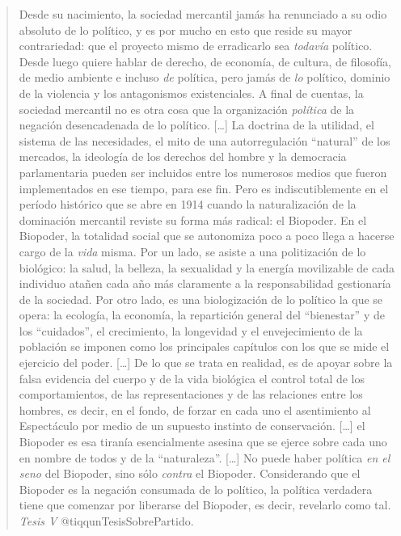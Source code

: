 \documentclass[
]{article}
\begin{document}
\begin{quote}
Desde su nacimiento, la sociedad mercantil jamás ha renunciado a su odio
absoluto de lo político, y es por mucho en esto que reside su mayor
contrariedad: que el proyecto mismo de erradicarlo sea \emph{todavía}
político. Desde luego quiere hablar de derecho, de economía, de cultura,
de filosofía, de medio ambiente e incluso \emph{de} política, pero jamás
de \emph{lo} político, dominio de la violencia y los antagonismos
existenciales. A final de cuentas, la sociedad mercantil no es otra cosa
que la organización \emph{política} de la negación desencadenada de lo
político. {[}\ldots{]} La doctrina de la utilidad, el sistema de las
necesidades, el mito de una autorregulación ``natural'' de los mercados,
la ideología de los derechos del hombre y la democracia parlamentaria
pueden ser incluidos entre los numerosos medios que fueron implementados
en ese tiempo, para ese fin. Pero es indiscutiblemente en el período
histórico que se abre en 1914 cuando la naturalización de la dominación
mercantil reviste su forma más radical: el Biopoder. En el Biopoder, la
totalidad social que se autonomiza poco a poco llega a hacerse cargo de
la \emph{vida} misma. Por un lado, se asiste a una politización de lo
biológico: la salud, la belleza, la sexualidad y la energía movilizable
de cada individuo atañen cada año más claramente a la responsabilidad
gestionaría de la sociedad. Por otro lado, es una biologización de lo
político la que se opera: la ecología, la economía, la repartición
general del ``bienestar'' y de los ``cuidados'', el crecimiento, la
longevidad y el envejecimiento de la población se imponen como los
principales capítulos con los que se mide el ejercicio del poder.
{[}\ldots{]} De lo que se trata en realidad, es de apoyar sobre la falsa
evidencia del cuerpo y de la vida biológica el control total de los
comportamientos, de las representaciones y de las relaciones entre los
hombres, es decir, en el fondo, de forzar en cada uno el asentimiento al
Espectáculo por medio de un supuesto instinto de conservación.
{[}\ldots{]} el Biopoder es esa tiranía esencialmente asesina que se
ejerce sobre cada uno en nombre de todos y de la ``naturaleza''.
{[}\ldots{]} No puede haber política \emph{en el seno} del Biopoder,
sino sólo \emph{contra} el Biopoder. Considerando que el Biopoder es la
negación consumada de lo político, la política verdadera tiene que
comenzar por liberarse del Biopoder, es decir, revelarlo como tal.
\emph{Tesis V} @tiqqunTesisSobrePartido.
\end{quote}
\end{document}
